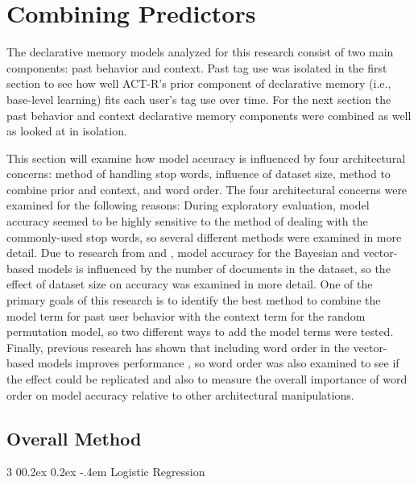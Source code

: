\documentclass[man,donotrepeattitle]{apa6}
\makeatletter
\renewcommand{\subsubsection}{%
  \@startsection
  {subsubsection}%
  {3}%
  {\parindent}%
  {0\baselineskip \@plus 0.2ex \@minus 0.2ex}%
  {-.4em}%
  {\normalfont\normalsize\bfseries\addperi}}
\makeatother
\begin{document}
\section{Combining Predictors}

The declarative memory models analyzed for this research consist of two main components: past behavior and context.
Past tag use was isolated in the first section to see how well ACT-R's prior component of declarative memory (i.e., base-level learning) fits each user's tag use over time.
For the next section the past behavior and context declarative memory components were combined as well as looked at in isolation.

This section will examine how model accuracy is influenced by four architectural concerns:
method of handling stop words, influence of dataset size, method to combine prior and context, and word order.
The four architectural concerns were examined for the following reasons:
During exploratory evaluation, model accuracy seemed to be highly sensitive to the method of dealing with the commonly-used stop words, so several different methods were examined in more detail.
Due to research from \textcite{Budiu2007} and \textcite{Recchia2010}, model accuracy for the Bayesian and vector-based models is influenced by the number of documents in the dataset,
so the effect of dataset size on accuracy was examined in more detail.
One of the primary goals of this research is to identify the best method to combine the model term for past user behavior with the context term for the random permutation model,
so two different ways to add the model terms were tested.
Finally, previous research has shown that including word order in the vector-based models improves performance \parencites{Jones2007, Sahlgren2008},
so word order was also examined to see if the effect could be replicated and also to measure the overall importance of word order on model accuracy relative to other architectural manipulations.

\subsection{Overall Method}

\subsubsection{Logistic Regression}
\end{document}
